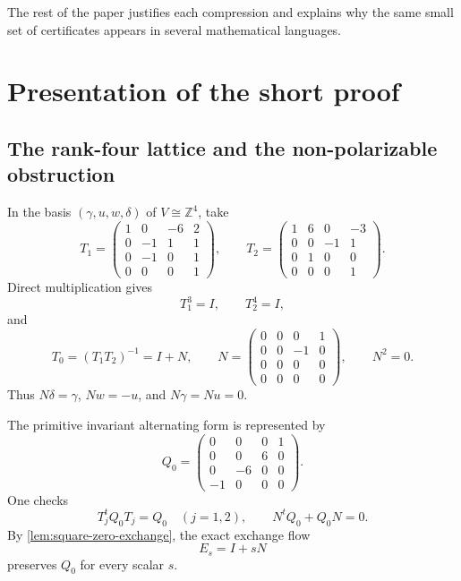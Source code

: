\documentclass[11pt,reqno]{amsart}
\numberwithin{equation}{section}
\newcommand{\Z}{\mathbb Z}
\theoremstyle{definition}
\begin{document}
The rest of the paper justifies each compression and explains why the same small set of certificates appears in several mathematical languages.

\section{Presentation of the short proof}\label{sec:proof}

\subsection{The rank-four lattice and the non-polarizable obstruction}\label{sec:lattice}

In the basis $(\gamma,u,w,\delta)$ of $V\cong\Z^4$, take
\begin{equation}\label{eq:T1T2}
T_1=
\begin{pmatrix}
1&0&-6&2\\
0&-1&1&1\\
0&-1&0&1\\
0&0&0&1
\end{pmatrix},
\qquad
T_2=
\begin{pmatrix}
1&6&0&-3\\
0&0&-1&1\\
0&1&0&0\\
0&0&0&1
\end{pmatrix}.
\end{equation}
Direct multiplication gives
\[
 T_1^3=I,
 \qquad
 T_2^4=I,
\]
and
\begin{equation}\label{eq:N}
T_0=(T_1T_2)^{-1}=I+N,
\qquad
N=
\begin{pmatrix}
0&0&0&1\\
0&0&-1&0\\
0&0&0&0\\
0&0&0&0
\end{pmatrix},
\qquad N^2=0.
\end{equation}
Thus $N\delta=\gamma$, $Nw=-u$, and $N\gamma=Nu=0$.

The primitive invariant alternating form is represented by
\begin{equation}\label{eq:Q0}
Q_0=
\begin{pmatrix}
0&0&0&1\\
0&0&6&0\\
0&-6&0&0\\
-1&0&0&0
\end{pmatrix}.
\end{equation}
One checks
\[
T_j^tQ_0T_j=Q_0
\quad(j=1,2),
\qquad
N^tQ_0+Q_0N=0.
\]
By \cref{lem:square-zero-exchange}, the exact exchange flow
\[
E_s=I+sN
\]
preserves $Q_0$ for every scalar $s$.
\end{document}
